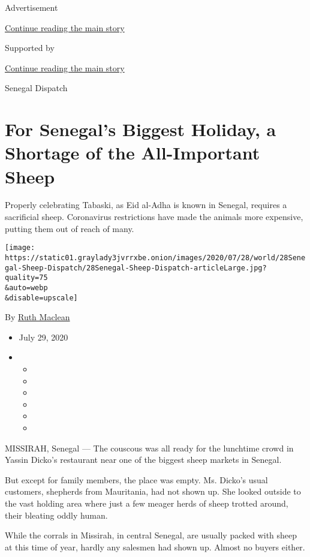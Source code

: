 Advertisement

\protect\hyperlink{after-top}{Continue reading the main story}

Supported by

\protect\hyperlink{after-sponsor}{Continue reading the main story}

Senegal Dispatch

\hypertarget{for-senegals-biggest-holiday-a-shortage-of-the-all-important-sheep}{%
\section{For Senegal's Biggest Holiday, a Shortage of the All-Important
Sheep}\label{for-senegals-biggest-holiday-a-shortage-of-the-all-important-sheep}}

Properly celebrating Tabaski, as Eid al-Adha is known in Senegal,
requires a sacrificial sheep. Coronavirus restrictions have made the
animals more expensive, putting them out of reach of many.

\texttt{[image: https://static01.graylady3jvrrxbe.onion/images/2020/07/28/world/28Senegal-Sheep-Dispatch/28Senegal-Sheep-Dispatch-articleLarge.jpg?quality=75\\\&auto=webp\\\&disable=upscale]}

By \href{https://www.nytimes3xbfgragh.onion/by/ruth-maclean}{Ruth
Maclean}

\begin{itemize}
\item
  July 29, 2020
\item
  \begin{itemize}
  \item
  \item
  \item
  \item
  \item
  \item
  \end{itemize}
\end{itemize}

MISSIRAH, Senegal --- The couscous was all ready for the lunchtime crowd
in Yassin Dicko's restaurant near one of the biggest sheep markets in
Senegal.

But except for family members, the place was empty. Ms. Dicko's usual
customers, shepherds from Mauritania, had not shown up. She looked
outside to the vast holding area where just a few meager herds of sheep
trotted around, their bleating oddly human.

While the corrals in Missirah, in central Senegal, are usually packed
with sheep at this time of year, hardly any salesmen had shown up.
Almost no buyers either.

